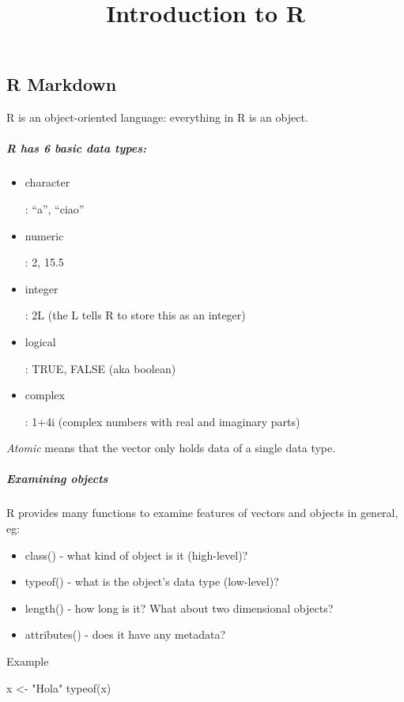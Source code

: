 \documentclass[
]{article}
\title{Introduction to R}
\author{}
\date{\vspace{-2.5em}}
\newenvironment{Shaded}{\begin{snugshade}}{\end{snugshade}}
\newcommand{\FunctionTok}[1]{\textcolor[rgb]{0.00,0.00,0.00}{#1}}
\newcommand{\NormalTok}[1]{#1}
\newcommand{\OtherTok}[1]{\textcolor[rgb]{0.56,0.35,0.01}{#1}}
\newcommand{\StringTok}[1]{\textcolor[rgb]{0.31,0.60,0.02}{#1}}
\providecommand{\tightlist}{%
  \setlength{\itemsep}{0pt}\setlength{\parskip}{0pt}}
\begin{document}
\maketitle

\hypertarget{r-markdown}{%
\subsection{R Markdown}\label{r-markdown}}

R is an object-oriented language: everything in R is an object.

\hypertarget{r-has-6-basic-data-types}{%
\subparagraph{R has 6 basic data
types:}\label{r-has-6-basic-data-types}}

\begin{itemize}
\item
  character

  : ``a'', ``ciao''
\item
  numeric

  : 2, 15.5
\item
  integer

  : 2L (the L tells R to store this as an integer)
\item
  logical

  : TRUE, FALSE (aka boolean)
\item
  complex

  : 1+4i (complex numbers with real and imaginary parts)
\end{itemize}

\emph{Atomic} means that the vector only holds data of a single data
type.

\hypertarget{examining-objects}{%
\subparagraph{Examining objects}\label{examining-objects}}

R provides many functions to examine features of vectors and objects in
general, eg:

\begin{itemize}
\tightlist
\item
  class() - what kind of object is it (high-level)?
\item
  typeof() - what is the object's data type (low-level)?
\item
  length() - how long is it? What about two dimensional objects?
\item
  attributes() - does it have any metadata?
\end{itemize}

Example

\begin{Shaded}
\begin{Highlighting}[]
\NormalTok{x }\OtherTok{\textless{}{-}} \StringTok{"Hola"}
\FunctionTok{typeof}\NormalTok{(x)}
\end{Highlighting}
\end{Shaded}
\end{document}
